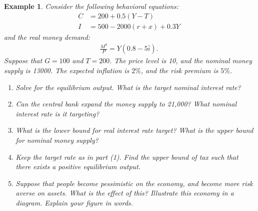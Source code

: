 \documentclass[12pt]{article}
\newtheorem{example}{Example}
\begin{document}
\begin{example}
    Consider the following behavioral equations:
    \begin{align*}
        C &= 200 + 0.5(Y-T)\\
        I &= 500 - 2000(r+x) + 0.3Y
    \end{align*}
    and the real money demand:
    \begin{align*}
        \frac{M^d}{P} = Y(0.8-5\bar{i}).
    \end{align*}
    Suppose that $G = 100$ and $T = 200$. The price level is 10, and the nominal money supply is 13000. The expected inflation is $2\%$, and the risk premium is $5\%$.
    \begin{enumerate}[label=(\arabic*)]
        \item Solve for the equilibrium output. What is the target nominal interest rate?
        \item Can the central bank expand the money supply to 21,000? What nominal interest rate is it targeting?
        \item What is the lower bound for real interest rate target? What is the upper bound for nominal money supply?
        \item Keep the target rate as in part (1). Find the upper bound of tax such that there exists a positive equilibrium output.
        \item Suppose that people become pessimistic on the economy, and become more risk averse on assets. What is the effect of this? Illustrate this economy in a diagram. Explain your figure in words.
    \end{enumerate}
\end{example}
\end{document}
